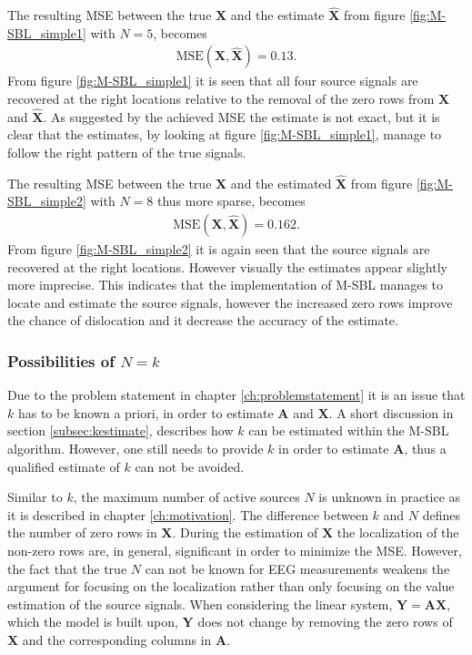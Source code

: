 \noindent
The resulting MSE between the true $\mathbf{X}$ and the estimate $\hat{\mathbf{X}}$ from figure \ref{fig:M-SBL_simple1} with $N = 5$, becomes 
\begin{align*}
\text{MSE}(\mathbf{X}, \hat{\mathbf{X}}) = 0.13.
\end{align*}
From figure \ref{fig:M-SBL_simple1} it is seen that all four source signals are recovered at the right locations relative to the removal of the zero rows from $\mathbf{X}$ and $\hat{\mathbf{X}}$. 
As suggested by the achieved MSE the estimate is not exact, but it is clear that the estimates, by looking at figure \ref{fig:M-SBL_simple1}, manage to follow the right pattern of the true signals. 

The resulting MSE between the true $\mathbf{X}$ and the estimated $\hat{\mathbf{X}}$ from figure \ref{fig:M-SBL_simple2} with $N = 8$ thus more sparse, becomes 
\begin{align*}
\text{MSE}(\mathbf{X}, \hat{\mathbf{X}}) = 0.162. 
\end{align*}
From figure \ref{fig:M-SBL_simple2} it is again seen that the source signals are recovered at the right locations. 
However visually the estimates appear slightly more imprecise. 
This indicates that the implementation of M-SBL manages to locate and estimate the source signals, however the increased zero rows improve the chance of dislocation and it decrease the accuracy of the estimate.     

\subsubsection*{Possibilities of $N=k$}
Due to the problem statement in chapter \ref{ch:problemstatement} it is an issue that $k$ has to be known a priori, in order to estimate $\mathbf{A}$ and $\mathbf{X}$. 
A short discussion in section \ref{subsec:kestimate}, describes how $k$ can be estimated within the M-SBL algorithm. 
However, one still needs to provide $k$ in order to estimate $\mathbf{A}$, thus a qualified estimate of $k$ can not be avoided. 

Similar to $k$, the maximum number of active sources $N$ is unknown in practice as it is described in chapter \ref{ch:motivation}. 
The difference between $k$ and $N$ defines the number of zero rows in $\mathbf{X}$.
During the estimation of $\mathbf{X}$ the localization of the non-zero rows are, in general, significant in order to minimize the MSE. 
However, the fact that the true $N$ can not be known for EEG measurements weakens the argument for focusing on the localization rather than only focusing on the value estimation of the source signals. 
When considering the linear system, $\mathbf{Y} = \mathbf{AX}$, which the model is built upon, $\mathbf{Y}$ does not change by removing the zero rows of $\mathbf{X}$ and the corresponding columns in $\mathbf{A}$.

